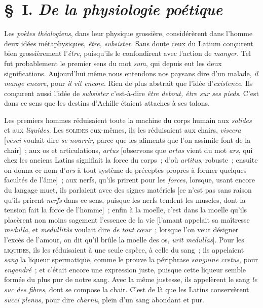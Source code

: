 \documentclass[french,twoside]{book} %
\begin{document}
\section[{§ I. De la physiologie poétique}]{§ I. {\itshape De la physiologie poétique}}
\noindent Les {\itshape poètes théologiens}, dans leur physique grossière, considérèrent dans l’homme deux idées métaphysiques, {\itshape être, subsister}. Sans doute ceux du Latium conçurent bien grossièrement l’{\itshape être}, puisqu’ils le confondirent avec l’action de {\itshape manger}. Tel fut probablement le premier sens du mot {\itshape sum}, qui depuis eut les deux significations. Aujourd’hui même nous entendons nos paysans dire d’un malade, {\itshape il mange encore}, pour {\itshape il vit encore}. Rien de plus abstrait que l’idée d’{\itshape existence}. Ils conçurent aussi l’idée de {\itshape subsister}  c’est-à-dire {\itshape être debout, être sur ses pieds}. C’est dans ce sens que les destins d’Achille étaient attaches à ses talons.\par
Les premiers hommes réduisaient toute la machine du corps humain aux {\itshape solides} et aux {\itshape liquides}. Les {\scshape solides} eux-mêmes, ils les réduisaient aux chairs, {\itshape viscera} [{\itshape vesci} voulait dire {\itshape se nourrir}, parce que les aliments que l’on assimile font de la chair] ; aux os et articulations, {\itshape artus} [observons que {\itshape artus} vient du mot {\itshape ars}, qui chez les anciens Latins signifiait la force du corps ; d’où {\itshape artitus}, robuste ; ensuite on donna ce nom d’{\itshape ars} à tout système de préceptes propres à former quelques facultés de l’âme] ; aux nerfs, qu’ils prirent pour les {\itshape forces}, lorsque, usant encore du langage muet, ils parlaient avec des signes matériels [ce n’est pas sans raison qu’ils prirent {\itshape nerfs} dans ce sens, puisque les nerfs tendent les muscles, dont la tension fait la force de l’homme] ; enfin à la moelle, c’est dans la moelle qu’ils placèrent non moins sagement l’essence de la vie [l’amant appelait sa maîtresse {\itshape medulla}, et {\itshape medullitùs} voulait dire {\itshape de tout cœur} ; lorsque l’on veut désigner l’excès de l’amour, on dit qu’il brûle la moelle des os, {\itshape urit medullas}]. Pour les {\scshape liquides}, ils les réduisaient à une seule espèce, à celle du sang ; ils appelaient {\itshape sang} la liqueur spermatique, comme le prouve la périphrase {\itshape sanguine cretus}, pour {\itshape engendré} ; et c’était encore une expression juste, puisque cette liqueur semble formée du plus pur de notre sang. Avec la même justesse, ils appelèrent le sang {\itshape le suc}  {\itshape des fibres}, dont se compose la chair. C’est de là que les Latins conservèrent {\itshape succi plenus}, pour dire {\itshape charnu}, plein d’un sang abondant et pur.\par
\end{document}
